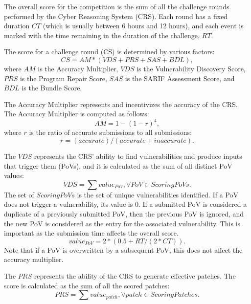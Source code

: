 The overall score for the competition is the sum of all the challenge rounds performed by the Cyber Reasoning System (CRS).
Each round has a fixed duration $CT$ (which is usually between 6 hours and 12 hours), and each event is marked with the time remaining in the duration of the challenge, $RT$.

The score for a challenge round (CS) is determined by various factors:
\begin{equation}
CS = AM * (VDS + PRS + SAS + BDL),
\end{equation}
where $AM$ is the Accuracy Multiplier, $VDS$ is the Vulnerability Discovery Score, $PRS$ is the Program Repair Score, $SAS$ is the SARIF Assessment Score, and $BDL$ is the Bundle Score.

The Accuracy Multiplier represents and incentivizes the accuracy of the CRS. The Accuracy Multiplier is computed as follows:
\begin{equation}
AM = 1 - (1 - r)^4,
\end{equation}
where $r$ is the ratio of accurate submissions to all submissions:
\begin{equation}
r = (accurate)/(accurate + inaccurate).
\end{equation}

The $VDS$ represents the CRS' ability to find vulnerabilities and produce inputs that trigger them (PoVs), and it is calculated as the sum of all distinct PoV values:
\begin{equation}
VDS = \sum value_{PoV}, \forall PoV \in ScoringPoVs.
\end{equation}
The set of $ScoringPoVs$ is the set of unique vulnerabilities identified. 
If a PoV does not trigger a vulnerability, its value is 0.
If a submitted PoV is considered a duplicate of a previously submitted PoV, then the previous PoV is ignored, and the new PoV is considered as the entry for the associated vulnerability.
This is important as the submission time affects the overall score.
\begin{equation}
value_{PoV} = 2 * (0.5 + RT/(2*CT)).    
\end{equation}
Note that if a PoV is overwritten by a subsequent PoV, this does not affect the accuracy multiplier.

The $PRS$ represents the ability of the CRS to generate effective patches.
The score is calculated as the sum of all the scored patches:
\begin{equation}
PRS = \sum value_{patch}, \forall patch \in ScoringPatches.
\end{equation}

